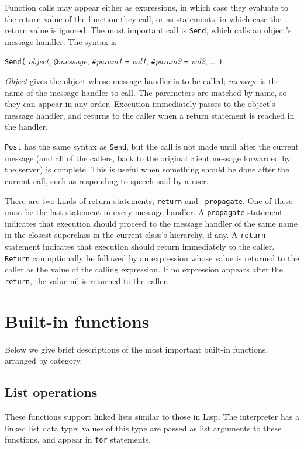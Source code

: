 \documentclass[12pt]{article}
\begin{document}
Function calls may appear either as expressions, in which case they evaluate
to the return value of the function they call, or as statements, in
which case the return value is ignored.  The most important call is
{\tt Send}, which calls an object's message handler.  The syntax is
\begin{center}
{\tt Send(} {\em object, } {\tt @}{\em message}, {\tt \#}{\em param1}
{\tt =} {\em val1}, {\tt \#}{\em param2} {\tt =} {\em val2}, \ldots
{\tt )}
\end{center}
{\em Object} gives the object whose message handler is to be called;
{\em message} is the name of the message handler to call.  The
parameters are matched by name, so they can appear in any order.
Execution immediately passes to the object's message handler, and
returns to the caller when a return statement is reached in the
handler.  

\texttt{Post} has the same syntax as \texttt{Send}, but the
call is not made until after the current message (and all of the
callers, back to the original client message forwarded by the server)
is complete.  This is useful when something should be done after the
current call, such as responding to speech said by a user.

There are two kinds of return statements, {\tt return} and {\tt
propagate}.  One of these must be the last statement in every message
handler.  A {\tt propagate} statement indicates that execution should
proceed to the message handler of the same name in the closest
superclass in the current class's hierarchy, if any.  A {\tt return}
statement indicates that execution should return immediately to the
caller.  {\tt Return} can optionally be followed by an expression
whose value is returned to the caller as the value of the calling
expression.  If no expression appears after the {\tt return}, the
value nil is returned to the caller.


\section{Built-in functions}

Below we give brief descriptions of the most important built-in
functions, arranged by category.  

\subsection{List operations}

These functions support linked lists similar to those in Lisp.  The
interpreter has a linked list data type; values of this type are
passed as list arguments to these functions, and appear in {\tt for}
statements.
\end{document}
